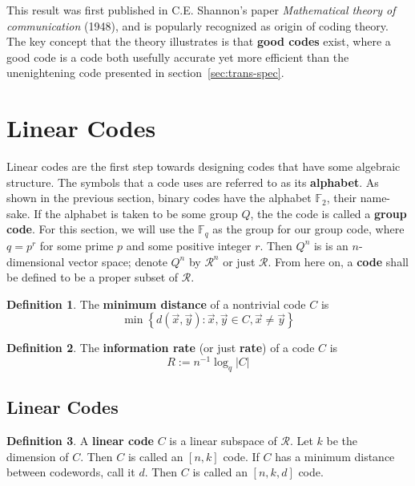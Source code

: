\documentclass{article}
\newcommand{\F}{\mathbb{F}}
\newcommand{\calR}{\mathcal{R}}
\renewcommand{\=}{\equiv}
\renewcommand{\i}{^{-1}}
\newcommand{\set}[1]{\left\{ #1 \right\}}
\renewcommand{\v}{\vec}
\newcommand{\x}{{\v x}}
\newcommand{\y}{{\v y}}
\theoremstyle{plain}
\theoremstyle{definition}
\newtheorem{defn}{Definition}[subsection]
\begin{document}
This result was first published in C.E. Shannon's paper \textit{Mathematical theory of communication} (1948), and is popularly recognized as origin of coding theory.
The key concept that the theory illustrates is that \textbf{good codes} exist, where a good code is a code both usefully accurate yet more efficient than the unenightening code presented in section~\ref{sec:trans-spec}.


\section{Linear Codes}

Linear codes are the first step towards designing codes that have some algebraic structure.
The symbols that a code uses are referred to as its \textbf{alphabet}. As shown in the previous section, binary codes have the alphabet $\F_2$, their name-sake.
If the alphabet is taken to be some group $Q$, the the code is called a \textbf{group code}.
For this section, we will use the $\F_q$ as the group for our group code, where $q = p^r$ for some prime $p$ and some positive integer $r$.
Then $Q^n$ is is an $n$-dimensional vector space; denote $Q^n$ by $\calR^n$ or just $\calR$.
From here on, a \textbf{code} shall be defined to be a proper subset of $\calR$.

\begin{defn}
The \textbf{minimum distance} of a nontrivial code $C$ is
$$ \min\set{ d(\x, \y) : \x,\y \in C, \x \neq \y } $$
\end{defn}

\begin{defn}
The \textbf{information rate} (or just \textbf{rate}) of a code $C$ is
$$ R := n\i \log_q |C| $$
\end{defn}

\subsection{Linear Codes}

\begin{defn}
A \textbf{linear code} $C$ is a linear subspace of $\calR$.
Let $k$ be the dimension of $C$.
Then $C$ is called an $[n,k]$ code.
If $C$ has a minimum distance between codewords, call it $d$.
Then $C$ is called an $[n,k,d]$ code.
\end{defn}
\end{document}
